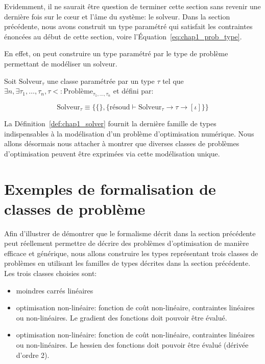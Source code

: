 Evidemment, il ne saurait être question de terminer cette section sans
revenir une dernière fois sur le c\oe ur et l'âme du système: le
solveur. Dans la section précédente, nous avons construit un type
paramétré qui satisfait les contraintes énoncées au début de cette
section, voire l'\'Equation~\ref{eq:chap1_prob_type}.


En effet, on peut construire un type paramétré par le type de problème
permettant de modéliser un solveur.

\begin{mydef}\label{def:chap1_solver}
  Soit $\text{Solveur}_{\tau}$ une classe paramétrée par un type $\tau$
  tel que $\exists n, \exists \tau_1, \dotsc, \tau_n, \tau <:
  \text{Problème}_{\tau_1, \dotsc, \tau_n}$ et défini par:

  \begin{equation}
    \text{Solveur}_{\tau} \equiv \{ \{ \}, \{ \text{résoud} \vdash
    \text{Solveur}_{\tau} \rightarrow \tau \rightarrow [\iota] \} \}
  \end{equation}
\end{mydef}

La Définition~\ref{def:chap1_solver} fournit la dernière famille de
types indispensables à la modélisation d'un problème d'optimisation
numérique. Nous allons désormais nous attacher à montrer que diverses
classes de problèmes d'optimisation peuvent être exprimées via cette
modélisation unique.


\section{Exemples de formalisation de classes de problème}


Afin d'illustrer de démontrer que le formalisme décrit dans la section
précédente peut réellement permettre de décrire des problèmes
d'optimisation de manière efficace et générique, nous allons
construire les types représentant trois classes de problèmes en
utilisant les familles de types décrites dans la section
précédente. Les trois classes choisies sont:

\begin{itemize}
\item moindres carrés linéaires
\item optimisation non-linéaire: fonction de coût non-linéaire,
  contraintes linéaires ou non-linéaires. Le gradient des fonctions
  doit pouvoir être évalué.
\item optimisation non-linéaire: fonction de coût non-linéaire,
  contraintes linéaires ou non-linéaires. Le hessien
  des fonctions doit pouvoir être évalué (dérivée d'ordre 2).
\end{itemize}


